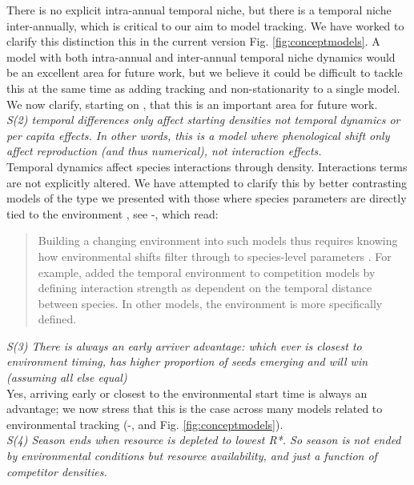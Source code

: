 \documentclass[11pt]{article}
\begin{document}
There is no explicit intra-annual temporal niche, but there is a temporal niche inter-annually, which is critical to our aim to model tracking. We have worked to clarify this distinction this in the current version Fig. \ref{fig:conceptmodels}. A model with both intra-annual and inter-annual temporal niche dynamics would be an excellent area for future work, but we believe it could be difficult to tackle this at the same time as adding tracking and non-stationarity to a single model. We now clarify, starting on , that this is an important area for future work. \\

\emph{S(2)     temporal differences only affect starting densities not temporal dynamics or per
capita effects. In other words, this is a model where phenological shift only affect
reproduction (and thus numerical), not interaction effects.}\\

Temporal dynamics affect species interactions through density. Interactions terms are not explicitly altered. We have attempted to clarify this by better contrasting models of the type we presented with those where species parameters are directly tied to the environment \citet{volkerass}, see -, which read:
\begin{quote}
Building a changing environment into such models thus requires knowing how environmental shifts filter through to species-level parameters \citep{Tuljapurkar2009}. For example, \citet{volkerass} added the temporal environment to competition models by defining interaction strength as dependent on the temporal distance between species. In other models, the environment is more specifically defined. 
\end{quote}

\emph{S(3)     There is always an early arriver advantage: which ever is closest to environment
timing, has higher proportion of seeds emerging and will win (assuming all else equal)}\\

Yes, arriving early or closest to the environmental start time is always an advantage; we now stress that this is the case across many models related to environmental tracking (-, and Fig. \ref{fig:conceptmodels}).\\

\emph{S(4)     Season ends when resource is depleted to lowest R*. So season is not ended by
environmental conditions but resource availability, and just a function of competitor
densities.}\\
\end{document}
